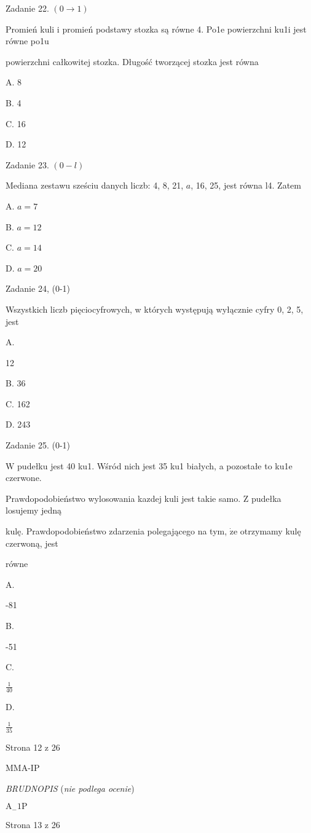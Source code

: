 \documentclass[a4paper,12pt]{article}
\begin{document}
Zadanie 22. $(0\rightarrow 1)$

Promień kuli i promień podstawy stozka są równe 4. Po1e powierzchni ku1i jest równe po1u

powierzchni całkowitej stozka. Długość tworzącej stozka jest równa

A. 8

B. 4

C. 16

D. 12

Zadanie 23. $(0-l)$

Mediana zestawu sześciu danych liczb: 4, 8, 21, $a$, 16, 25, jest równa l4. Zatem

A. $a=7$

B. $a=12$

C. $a=14$

D. $a=20$

Zadanie 24, (0-1)

Wszystkich liczb pięciocyfrowych, w których występują wyłącznie cyfry 0, 2, 5, jest

A.

12

B. 36

C. 162

D. 243

Zadanie 25. (0-1)

$\mathrm{W}$ pudełku jest 40 ku1. Wśród nich jest 35 ku1 białych, a pozostałe to ku1e czerwone.

Prawdopodobieństwo wylosowania kazdej kuli jest takie samo. $\mathrm{Z}$ pudełka losujemy jedną

kulę. Prawdopodobieństwo zdarzenia polegającego na tym, $\dot{\mathrm{z}}\mathrm{e}$ otrzymamy kulę czerwoną, jest

równe

A.

-81

B.

-51

C.

$\displaystyle \frac{1}{40}$

D.

$\displaystyle \frac{1}{35}$

Strona 12 z 26

MMA-IP





{\it BRUDNOPIS} ({\it nie podlega ocenie})

$\mathrm{A}_{-}1\mathrm{P}$

Strona 13 z 26
\end{document}
